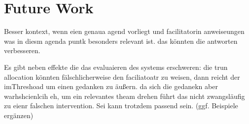 \section{Future Work}

Besser kontext, wenn eien genaua agend vorliegt und facilitatorin anweiseungen was in diesm agenda puntk
besonders relevant ist. das könnten die antworten verbesseren.

Es gibt neben effekte die das evaluaieren des systems erschweren: die trun allocation könnten
fälschlicherweise den faciliatoatr zu weisen, dann reicht der imThreshoad um einen gedanken zu äußern. da
sich die gedanekn aber warhshcienlcih eh, um ein relevantes theam drehen führt das nicht zwangsläufig zu
eienr falschen intervention. Sei kann trotzdem passend sein. (ggf. Beispiele ergänzen)